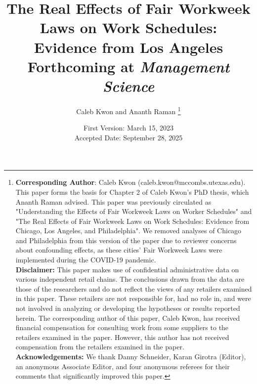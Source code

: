 \documentclass[letterpaper,11pt,leqno]{article}
\theoremstyle{paper}
\begin{document}
\title{\Large The Real Effects of Fair Workweek Laws on Work Schedules: \\ Evidence from Los Angeles \\[0.5em] \normalsize Forthcoming at \textit{Management Science}}
\author{Caleb Kwon and Ananth Raman
\thanks{
\textbf{Corresponding Author}: Caleb Kwon (caleb.kwon@mccombs.utexas.edu). This paper forms the basis for Chapter 2 of Caleb Kwon's PhD thesis, which Ananth Raman advised. This paper was previously circulated as "Understanding the Effects of Fair Workweek Laws on Worker Schedules" and "The Real Effects of Fair Workweek Laws on Work Schedules: Evidence from Chicago, Los Angeles, and Philadelphia". We removed analyses of Chicago and Philadelphia from this version of the paper due to reviewer concerns about confounding effects, as these cities' Fair Workweek Laws were implemented during the COVID-19 pandemic. \\ 
\textbf{Disclaimer:} This paper makes use of confidential administrative data on various independent retail chains. The conclusions drawn from the data are those of the researchers and do not reflect the views of any retailers examined in this paper. These retailers are not responsible for, had no role in, and were not involved in analyzing or developing the hypotheses or results reported herein.
The corresponding author of this paper, Caleb Kwon, has received financial compensation for consulting work from some suppliers to the retailers examined in the paper. However, this author has not received compensation from the retailers examined in the paper.\\
\textbf{Acknowledgements:} We thank Danny Schneider, Karan Girotra (Editor), an anonymous Associate Editor, and four anonymous referees for their comments that significantly improved this paper.  }}
\date{First Version: March 15, 2023\\
Accepted Date: September 28, 2025} 
\end{document}
